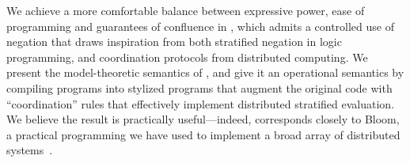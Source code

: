 We achieve a more comfortable balance between expressive power, ease of programming and guarantees of confluence in \plang, which admits a controlled use of negation that draws inspiration from both stratified negation in logic programming, and coordination protocols from distributed computing.  We present the model-theoretic semantics of \plang, and give it an operational semantics by compiling \plang programs into stylized \lang programs that 
augment the original code with ``coordination'' rules that effectively implement distributed stratified evaluation. 
We believe the result is practically useful---indeed, \plang corresponds closely to Bloom, a practical programming we have used to implement a broad array of distributed systems~\cite{bloom}.


